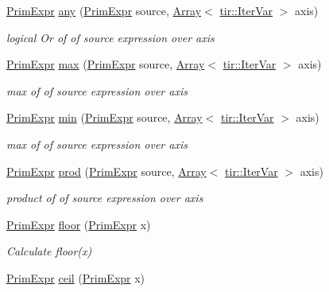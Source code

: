 \begin{DoxyCompactItemize}
\hyperlink{classtvm_1_1PrimExpr}{Prim\+Expr} \hyperlink{namespacetvm_a48629d1a87dfe0b51260defe79c82a60}{any} (\hyperlink{classtvm_1_1PrimExpr}{Prim\+Expr} source, \hyperlink{classtvm_1_1Array}{Array}$<$ \hyperlink{classtvm_1_1tir_1_1IterVar}{tir\+::\+Iter\+Var} $>$ axis)
\begin{DoxyCompactList}\small\item\em logical Or of of source expression over axis \end{DoxyCompactList}\item 
\hyperlink{classtvm_1_1PrimExpr}{Prim\+Expr} \hyperlink{namespacetvm_a80f15d31bf89ba7654442d9ca9a91a18}{max} (\hyperlink{classtvm_1_1PrimExpr}{Prim\+Expr} source, \hyperlink{classtvm_1_1Array}{Array}$<$ \hyperlink{classtvm_1_1tir_1_1IterVar}{tir\+::\+Iter\+Var} $>$ axis)
\begin{DoxyCompactList}\small\item\em max of of source expression over axis \end{DoxyCompactList}\item 
\hyperlink{classtvm_1_1PrimExpr}{Prim\+Expr} \hyperlink{namespacetvm_a2028eb350061871512cf50fed0e6fa6b}{min} (\hyperlink{classtvm_1_1PrimExpr}{Prim\+Expr} source, \hyperlink{classtvm_1_1Array}{Array}$<$ \hyperlink{classtvm_1_1tir_1_1IterVar}{tir\+::\+Iter\+Var} $>$ axis)
\begin{DoxyCompactList}\small\item\em max of of source expression over axis \end{DoxyCompactList}\item 
\hyperlink{classtvm_1_1PrimExpr}{Prim\+Expr} \hyperlink{namespacetvm_afd8718fe1f413ab2850cdbb66adfbecc}{prod} (\hyperlink{classtvm_1_1PrimExpr}{Prim\+Expr} source, \hyperlink{classtvm_1_1Array}{Array}$<$ \hyperlink{classtvm_1_1tir_1_1IterVar}{tir\+::\+Iter\+Var} $>$ axis)
\begin{DoxyCompactList}\small\item\em product of of source expression over axis \end{DoxyCompactList}\item 
\hyperlink{classtvm_1_1PrimExpr}{Prim\+Expr} \hyperlink{namespacetvm_a45896c89bce01ea68b5a8f3ea37f3079}{floor} (\hyperlink{classtvm_1_1PrimExpr}{Prim\+Expr} x)
\begin{DoxyCompactList}\small\item\em Calculate floor(x) \end{DoxyCompactList}\item 
\hyperlink{classtvm_1_1PrimExpr}{Prim\+Expr} \hyperlink{namespacetvm_a530307f2fad9f6d196c441309af777b9}{ceil} (\hyperlink{classtvm_1_1PrimExpr}{Prim\+Expr} x)

\end{DoxyCompactItemize}
